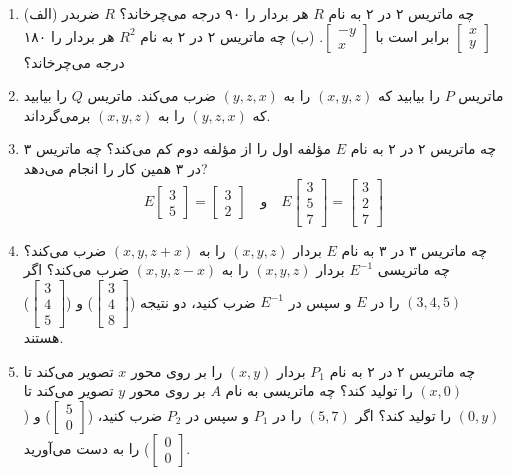 \documentclass[12pt, a4paper]{book}
\begin{document}
\begin{enumerate}[label=\arabic*.]
		\item
		(الف) چه ماتریس ۲ در ۲ به نام $R$ هر بردار را ۹۰ درجه می‌چرخاند؟ $R$ ضربدر $\begin{bmatrix} x \\ y \end{bmatrix}$ برابر است با $\begin{bmatrix} -y \\ x \end{bmatrix}$.
		(ب) چه ماتریس ۲ در ۲ به نام $R^2$ هر بردار را ۱۸۰ درجه می‌چرخاند؟
		
		\item
		ماتریس $P$ را بیابید که $(x,y,z)$ را به $(y,z,x)$ ضرب می‌کند. ماتریس $Q$ را بیابید که $(y,z,x)$ را به $(x,y,z)$ برمی‌گرداند.
		
		\item
		چه ماتریس ۲ در ۲ به نام $E$ مؤلفه اول را از مؤلفه دوم کم می‌کند؟ چه ماتریس ۳ در ۳ همین کار را انجام می‌دهد?
		\[ E \begin{bmatrix} 3 \\ 5 \end{bmatrix} = \begin{bmatrix} 3 \\ 2 \end{bmatrix} \quad \text{و} \quad E \begin{bmatrix} 3 \\ 5 \\ 7 \end{bmatrix} = \begin{bmatrix} 3 \\ 2 \\ 7 \end{bmatrix} \]
		
		\item
		چه ماتریس ۳ در ۳ به نام $E$ بردار $(x,y,z)$ را به $(x,y,z+x)$ ضرب می‌کند؟ چه ماتریسی $E^{-1}$ بردار $(x,y,z)$ را به $(x,y,z-x)$ ضرب می‌کند؟ اگر $(3,4,5)$ را در $E$ و سپس در $E^{-1}$ ضرب کنید، دو نتیجه ($\begin{bmatrix} 3 \\ 4 \\ 8 \end{bmatrix}$) و ($\begin{bmatrix} 3 \\ 4 \\ 5 \end{bmatrix}$) هستند.
		
		\item
		چه ماتریس ۲ در ۲ به نام $P_1$ بردار $(x,y)$ را بر روی محور $x$ تصویر می‌کند تا $(x,0)$ را تولید کند؟ چه ماتریسی به نام $A$ بر روی محور $y$ تصویر می‌کند تا $(0,y)$ را تولید کند؟ اگر $(5,7)$ را در $P_1$ و سپس در $P_2$ ضرب کنید، ($\begin{bmatrix} 5 \\ 0 \end{bmatrix}$) و ($\begin{bmatrix} 0 \\ 0 \end{bmatrix}$) را به دست می‌آورید.
		

\end{enumerate}
\end{document}
